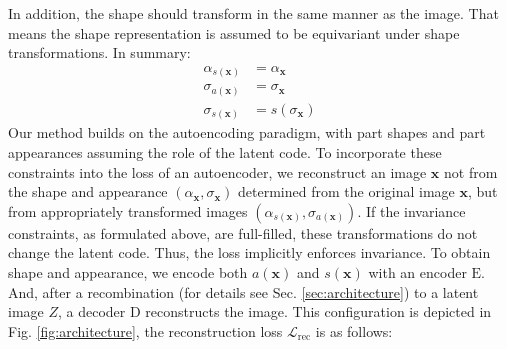	In addition, the shape should transform in the same manner as the image.
	That means the shape representation is assumed to be equivariant under shape transformations.
	In summary:
	\begin{align}
		{\alpha}_{s(\mathbf{x})}  &= {\alpha}_{\mathbf{x}} \tag{invariance of appearance}\\
		{\sigma}_{a(\mathbf{x})} &= {\sigma}_{\mathbf{x}}  \tag{invariance of shape}\\
		{\sigma}_{s(\mathbf{x})} &= s({\sigma}_{\mathbf{x}}) \tag{equivariance of shape}
	\label{eq:invar}
	\end{align} %
	Our method builds on the autoencoding paradigm, with part shapes and part appearances assuming the role of the latent code.
	To incorporate these constraints into the loss of an autoencoder, we reconstruct an image $\mathbf{x}$ not from the shape and appearance $({\alpha}_\mathbf{x}, {\sigma}_\mathbf{x})$ determined from the original image $\mathbf{x}$, but from appropriately transformed images $({\alpha}_{s(\mathbf{x})}, {\sigma}_{a(\mathbf{x})})$.
	If the invariance constraints, as formulated above, are full-filled, these transformations do not change the latent code.
	Thus, the loss implicitly enforces invariance.
	To obtain shape and appearance, we encode both $a(\mathbf{x})$ and $s(\mathbf{x})$ with an encoder $\mathrm{E}$.
	And, after a recombination (for details see Sec. \ref{sec:architecture}) to a latent image $Z$, a decoder $\mathrm{D}$ reconstructs the image.
	This configuration is depicted in Fig. \ref{fig:architecture}, the reconstruction loss $\mathcal{L}_{\textrm{rec}}$ is as follows:
